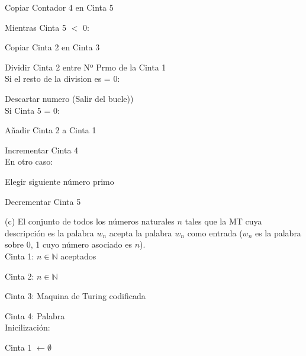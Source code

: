 \documentclass{article}
\begin{document}
\hspace{1.5cm}Copiar Contador 4 en Cinta 5

\hspace{1.5cm}Mientras Cinta 5 $<$ 0:

\hspace{2cm}Copiar Cinta 2 en Cinta 3

\hspace{2cm}Dividir Cinta 2 entre Nº Prmo de la Cinta 1\\

\hspace{2cm}Si el resto de la division es = 0:

\hspace{2.5cm}Descartar numero (Salir del bucle))\\

\hspace{2cm}Si Cinta 5 = 0:

\hspace{2.5cm}Añadir Cinta 2 a Cinta 1

\hspace{2.5cm}Incrementar Cinta 4\\

\hspace{2cm}En otro caso:

\hspace{2.5cm}Elegir siguiente número primo

\hspace{2.5cm}Decrementar Cinta 5


\newpage

(c) El conjunto de todos los números naturales $n$ tales que la MT cuya descripción es la palabra $w_{n}$ acepta la palabra $w_{n}$ como entrada ($w_{n}$ es la palabra sobre {0, 1} cuyo número asociado es $n$).\\

\hspace{1cm}Cinta 1: $n\in\mathbb{N}$ aceptados

\hspace{1cm}Cinta 2: $n\in\mathbb{N}$

\hspace{1cm}Cinta 3: Maquina de Turing codificada

\hspace{1cm}Cinta 4: Palabra\\

\hspace{1cm}Inicilización:

\hspace{1.5cm}Cinta 1 $\leftarrow \emptyset$
\end{document}
